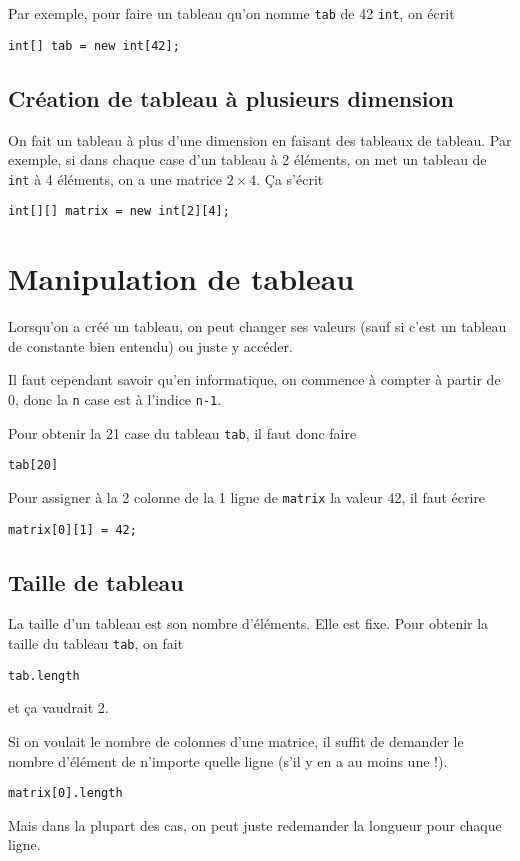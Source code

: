Par exemple, pour faire un tableau qu'on nomme \verb|tab| de 42 \verb|int|,
on écrit
\begin{lstlisting}
int[] tab = new int[42];
\end{lstlisting}

\subsection{Création de tableau à plusieurs dimension}
On fait un tableau à plus d'une dimension en faisant des tableaux de tableau.
Par exemple, si dans chaque case d'un tableau à 2 éléments, on met un
tableau de \verb|int| à 4 éléments, on a une matrice $2 \times 4$.
Ça s'écrit
\begin{lstlisting}
int[][] matrix = new int[2][4];
\end{lstlisting}

\section{Manipulation de tableau}
Lorsqu'on a créé un tableau, on peut changer ses valeurs (sauf si c'est un
tableau de constante bien entendu) ou juste y accéder.

Il faut cependant savoir qu'en informatique, on commence à compter à partir
de 0, donc la \verb|n|\ieme{} case est à l'indice \verb|n-1|.

Pour obtenir la 21\ieme{} case du tableau \verb|tab|, il faut donc faire
\begin{lstlisting}
tab[20]
\end{lstlisting}

Pour assigner à la 2\ieme{} colonne de la 1\iere{} ligne de \verb|matrix|
la valeur 42, il faut écrire
\begin{lstlisting}
matrix[0][1] = 42;
\end{lstlisting}

\subsection{Taille de tableau}
La taille d'un tableau est son nombre d'éléments.
Elle est fixe.
Pour obtenir la taille du tableau \verb|tab|, on fait
\begin{lstlisting}
tab.length
\end{lstlisting}
et ça vaudrait 2.

Si on voulait le nombre de colonnes d'une matrice, il suffit de demander
le nombre d'élément de n'importe quelle ligne (s'il y en a au moins une !).
\begin{lstlisting}
matrix[0].length
\end{lstlisting}
Mais dans la plupart des cas,
on peut juste redemander la longueur pour chaque ligne.

